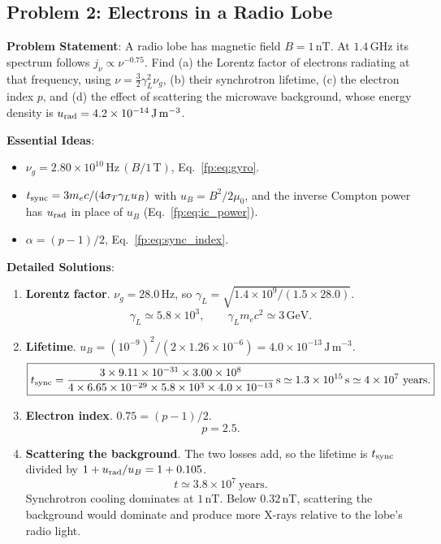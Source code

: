 \subsection{Problem 2: Electrons in a Radio Lobe}
\label{fp:prob:lobe}

\textbf{Problem Statement}: A radio lobe has magnetic field $B=1\,\mathrm{nT}$. At $1.4\,\mathrm{GHz}$ its spectrum follows $j_\nu\propto\nu^{-0.75}$. Find (a) the Lorentz factor of electrons radiating at that frequency, using $\nu=\tfrac32\gamma_L^2\nu_g$, (b) their synchrotron lifetime, (c) the electron index $p$, and (d) the effect of scattering the microwave background, whose energy density is $u_{\rm rad}=4.2\times10^{-14}\,\mathrm{J\,m^{-3}}$.

\textbf{Essential Ideas}:
\begin{itemize}
	\item $\nu_g=2.80\times10^{10}\,\mathrm{Hz}\,(B/1\,\mathrm T)$, Eq.~\eqref{fp:eq:gyro}.
	\item $t_{\rm sync}=3m_ec/(4\sigma_T\gamma_Lu_B)$ with $u_B=B^2/2\mu_0$, and the inverse Compton power has $u_{\rm rad}$ in place of $u_B$ (Eq.~\eqref{fp:eq:ic_power}).
	\item $\alpha=(p-1)/2$, Eq.~\eqref{fp:eq:sync_index}.
\end{itemize}

\textbf{Detailed Solutions}:
\begin{enumerate}[label=(\alph*)]
	\item \textbf{Lorentz factor}. $\nu_g=28.0\,\mathrm{Hz}$, so $\gamma_L=\sqrt{1.4\times10^9/(1.5\times28.0)}$.
	\[
	\boxed{\gamma_L\simeq5.8\times10^3,\qquad \gamma_Lm_ec^2\simeq3\,\mathrm{GeV}.}
	\]
	\item \textbf{Lifetime}. $u_B=(10^{-9})^2/(2\times1.26\times10^{-6})=4.0\times10^{-13}\,\mathrm{J\,m^{-3}}$.
	\[
	\boxed{t_{\rm sync}=\frac{3\times9.11\times10^{-31}\times3.00\times10^8}{4\times6.65\times10^{-29}\times5.8\times10^3\times4.0\times10^{-13}}\,\mathrm s\simeq1.3\times10^{15}\,\mathrm s\simeq4\times10^7\ \text{years}.}
	\]
	\item \textbf{Electron index}. $0.75=(p-1)/2$.
	\[
	\boxed{p=2.5.}
	\]
	\item \textbf{Scattering the background}. The two losses add, so the lifetime is $t_{\rm sync}$ divided by $1+u_{\rm rad}/u_B=1+0.105$.
	\[
	\boxed{t\simeq3.8\times10^7\ \text{years}.}
	\]
	Synchrotron cooling dominates at $1\,\mathrm{nT}$. Below $0.32\,\mathrm{nT}$, scattering the background would dominate and produce more X-rays relative to the lobe's radio light.
\end{enumerate}

